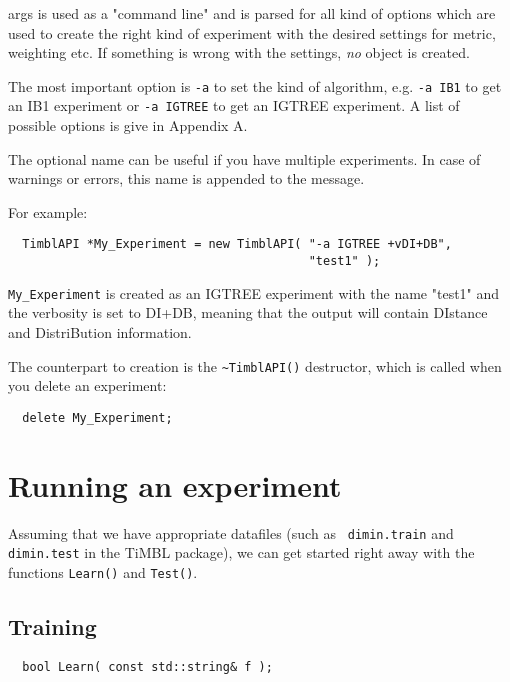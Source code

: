 \documentclass{report}
\begin{document}
args is used as a "command line" and is parsed for all kind of options
which are used to create the right kind of experiment with the desired
settings for metric, weighting etc. If something is wrong with the
settings, {\em no}\/ object is created.

The most important option is {\tt -a}  to set the kind of algorithm,
e.g. {\tt -a IB1} to get an IB1 experiment or {\tt -a IGTREE} to get an IGTREE
experiment. A list of possible options is give in Appendix A.

The optional name can be useful if you have multiple experiments.
In case of warnings or errors, this name is appended to the message.

For example:

\begin{footnotesize}
\begin{verbatim}
  TimblAPI *My_Experiment = new TimblAPI( "-a IGTREE +vDI+DB", 
                                          "test1" );
\end{verbatim}
\end{footnotesize}

{\tt My\_Experiment} is created as an IGTREE experiment with the name
"test1" and the verbosity is set to DI+DB, meaning that the output
will contain DIstance and DistriBution information.

The counterpart to creation is the {\tt \~{ }TimblAPI()} destructor,
which is called when you delete an experiment:

\begin{footnotesize}
\begin{verbatim}
  delete My_Experiment;
\end{verbatim}
\end{footnotesize}

\section{Running an experiment}

Assuming that we have appropriate datafiles (such as {\tt
dimin.train} and {\tt dimin.test} in the TiMBL package), we can get
started right away with the functions {\tt Learn()} and {\tt Test()}.

\subsection{Training}
\begin{footnotesize}
\begin{verbatim}
  bool Learn( const std::string& f );
\end{verbatim}
\end{footnotesize}
\end{document}
